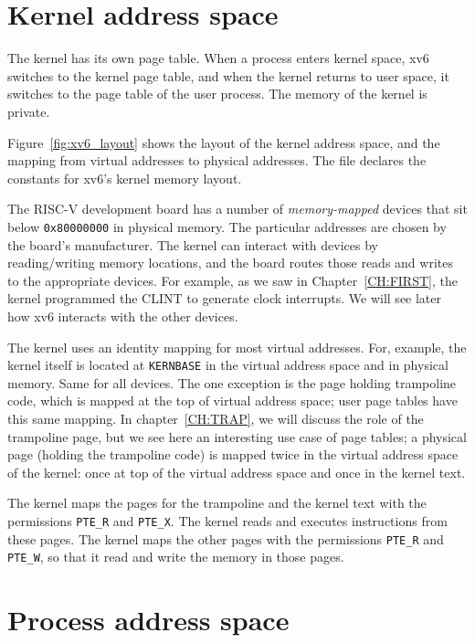 \section{Kernel address space}
The kernel has its own page table.  When a process enters kernel
space, xv6 switches to the kernel page table, and when the kernel
returns to user space, it switches to the page table of the user
process.  The memory of the kernel is private.

Figure~\ref{fig:xv6_layout}
shows the layout of the kernel address space, and the mapping from
virtual addresses to physical addresses.  The file
declares the constants for xv6's kernel memory layout.

The RISC-V development board has a number of
\textit{memory-mapped}
devices that sit below
\texttt{0x80000000}
in physical memory. The particular addresses are chosen by the board's
manufacturer.  The kernel can interact with devices by reading/writing
memory locations, and the board routes those reads and writes to the
appropriate devices. For example, as we saw in Chapter~\ref{CH:FIRST}, the kernel
programmed the CLINT to generate clock interrupts.  We will
see later how xv6 interacts with the other devices.

The kernel uses an identity mapping for most virtual addresses.  For,
example, the kernel itself is located at
\lstinline{KERNBASE}
in the virtual address space and in physical memory.  Same for all
devices.  The one exception is the page holding trampoline code, which
is mapped at the top of virtual address space; user page tables have
this same mapping.  In chapter~\ref{CH:TRAP}, we will discuss the role
of the trampoline page, but we see here an interesting use case of
page tables; a physical page (holding the trampoline code) is
mapped twice in the virtual address space of the kernel: once at top
of the virtual address space and once in the kernel text.

The kernel maps the pages for the trampoline and the kernel text with
the permissions
\lstinline{PTE_R}
and
\lstinline{PTE_X}.
The kernel reads and executes instructions from these pages.
The kernel maps the other pages with the permissions
\lstinline{PTE_R}
and
\lstinline{PTE_W},
so that it read and write the memory in those pages.
\section{Process address space}

